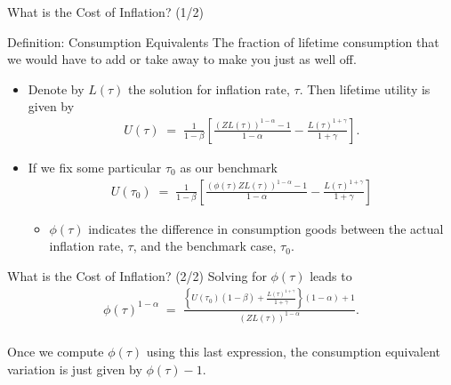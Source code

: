 \documentclass[10pt,c,aspectratio=1610,handout]{beamer}
\begin{document}
\begin{frame}{What is the Cost of Inflation? (1/2)}%
  \begin{block}{Definition: Consumption Equivalents}%
    The fraction of lifetime consumption that we would have to add or take away to make you just as well off.%
  \end{block}%
  \pause%
  \begin{itemize}%
    \item[$\blacktriangleright$] Denote by $L(\tau)$ the solution for inflation rate, $\tau$. Then lifetime utility is given by%
    \begin{align*}%
      U (\tau) \; = \; \frac{1}{1-\beta} \left[ \frac{\left( Z L (\tau) \right)^{1-\alpha} - 1}{1-\alpha} - \frac{L(\tau)^{1+\gamma}}{1+\gamma} \right] .%
    \end{align*}%
    \pause%
    \item[$\blacktriangleright$] If we fix some particular $\tau_{0}$ as our benchmark%
    \begin{align*}%
      U (\tau_{0}) \; = \; \frac{1}{1-\beta} \left[ \frac{\left( \phi (\tau) Z L (\tau) \right)^{1-\alpha} - 1}{1-\alpha}-\frac{L(\tau)^{1+\gamma}}{1+\gamma} \right]%
    \end{align*}%
    \begin{itemize}%
      \item[$\rightarrow$] $\phi(\tau)$ indicates the difference in consumption goods between the actual inflation rate, $\tau$, and the benchmark case, $\tau_0$.%
    \end{itemize}%
  \end{itemize}%
\end{frame}%
\begin{frame}{What is the Cost of Inflation? (2/2)}%
  Solving for $\phi\left(\tau\right)$ leads to\\%
  \begin{align}%
    \phi (\tau)^{1-\alpha} \; = \; \frac{\left\{ U(\tau_{0})(1-\beta) + \frac{L(\tau)^{1+\gamma}}{1+\gamma} \right\} (1-\alpha) + 1}{( Z L(\tau))^{1-\alpha}}. \label{eq:phi-consadj}%
  \end{align}\\%
  \vspace*{0.25in}%
  \pause%
  Once we compute $\phi(\tau)$ using this last expression, the consumption equivalent variation is just given by $\phi (\tau )-1.$%
\end{frame}%
\end{document}
